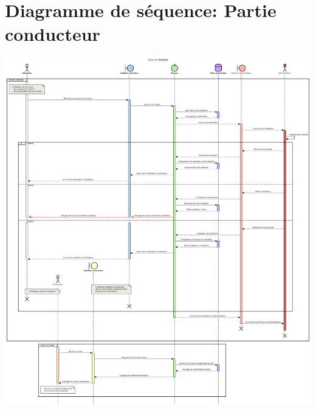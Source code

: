 \section{Diagramme de séquence: Partie conducteur}
\label{Diagramme de séquence: Partie conducteur}
\begin{center}
\includegraphics[width=\linewidth]{medias/seqConducteur.png}
\end{center}

